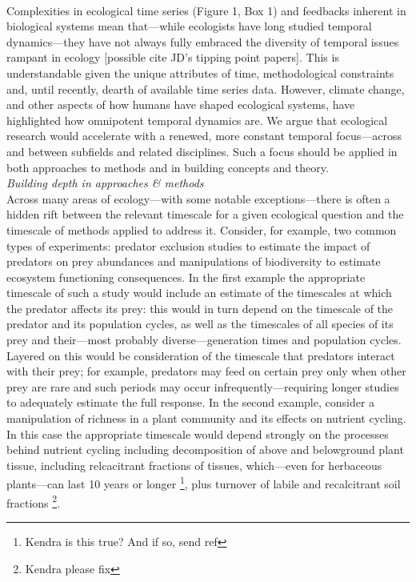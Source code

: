 \documentclass[11pt,a4paper,oneside]{article}
\begin{document}
\\

Complexities in ecological time series (Figure 1, Box 1) and feedbacks inherent in biological systems mean that---while ecologists have long studied temporal dynamics---they have not always fully embraced the diversity of temporal issues rampant in ecology [possible cite JD's tipping point papers]. This is understandable given the unique attributes of time, methodological constraints and, until recently, dearth of available time series data. However, climate change, and other aspects of how humans have shaped ecological systems, have highlighted how omnipotent temporal dynamics are. We argue that ecological research would accelerate with a renewed, more constant temporal focus---across and between subfields and related disciplines. Such a focus should be applied in both approaches to methods and in building concepts and theory.\\ %

\noindent \emph{Building depth in approaches \& methods}\\
Across many areas of ecology---with some notable exceptions---there is often a hidden rift between the relevant timescale for a given ecological question and the timescale of methods applied to address it. Consider, for example, two common types of experiments: predator exclusion studies to estimate the impact of predators on prey abundances and manipulations of biodiversity to estimate ecosystem functioning consequences. In the first example the appropriate timescale of such a study would include an estimate of the timescales at which the predator affects its prey: this would in turn depend on the timescale of the predator and its population cycles, as well as the timescales of all species of its prey and their---most probably diverse---generation times and population cycles. Layered on this would be consideration of the timescale that predators interact with their prey; for example, predators may feed on certain prey only when other prey are rare and such periods may occur infrequently---requiring longer studies to adequately estimate the full response. In the second example, consider a manipulation of richness in a plant community and its effects on nutrient cycling. In this case the appropriate timescale would depend strongly on the processes behind nutrient cycling including decomposition of above and belowground plant tissue, including relcacitrant fractions of tissues, which---even for herbaceous plants---can last 10 years or longer \footnote{Kendra is this true? And if so, send ref}, plus turnover of labile and recalcitrant soil fractions \footnote{Kendra please fix}. \\
\end{document}
